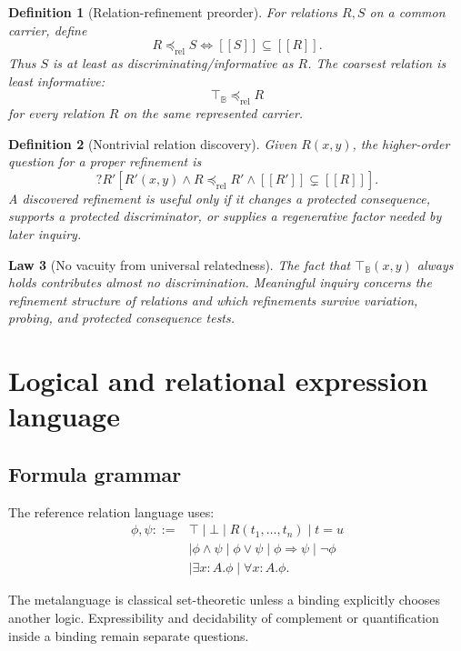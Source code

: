 \documentclass[11pt,oneside]{article}
\newtheorem{definition}{Definition}[section]
\newtheorem{law}[definition]{Law}
\newcommand{\B}{\mathbb B}
\newcommand{\den}[1]{[\![#1]\!]}
\begin{document}
\begin{definition}[Relation-refinement preorder]
For relations \(R,S\) on a common carrier, define
\[
\boxed{
R\preceq_{\mathrm{rel}}S
\iff
\den S\subseteq\den R.
}
\]
Thus \(S\) is at least as discriminating/informative as \(R\).  The coarsest relation is least informative:
\[
\top_{\B}\preceq_{\mathrm{rel}}R
\]
for every relation \(R\) on the same represented carrier.
\end{definition}

\begin{definition}[Nontrivial relation discovery]
Given \(R(x,y)\), the higher-order question for a proper refinement is
\[
\boxed{
?R'[
R'(x,y)
\land
R\preceq_{\mathrm{rel}}R'
\land
\den{R'}\subsetneq\den R
].
}
\]
A discovered refinement is useful only if it changes a protected consequence, supports a protected discriminator, or supplies a regenerative factor needed by later inquiry.
\end{definition}

\begin{law}[No vacuity from universal relatedness]
The fact that \(\top_{\B}(x,y)\) always holds contributes almost no discrimination.  Meaningful inquiry concerns the refinement structure of relations and which refinements survive variation, probing, and protected consequence tests.
\end{law}

\section{Logical and relational expression language}

\subsection{Formula grammar}

The reference relation language uses:
\[
\begin{aligned}
\phi,\psi ::= {}&
\top
\mid \bot
\mid R(t_1,\ldots,t_n)
\mid t=u\\
&\mid \phi\land\psi
\mid \phi\lor\psi
\mid \phi\Rightarrow\psi
\mid \neg\phi\\
&\mid \exists x:A.\phi
\mid \forall x:A.\phi.
\end{aligned}
\]

The metalanguage is classical set-theoretic unless a binding explicitly chooses another logic.  Expressibility and decidability of complement or quantification inside a binding remain separate questions.
\end{document}
